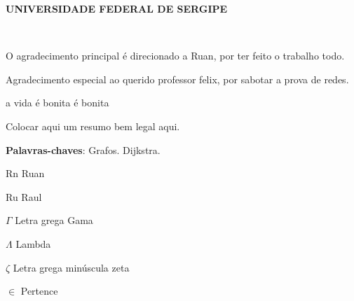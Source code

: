 \documentclass[
	12pt,				%
	openright,			%
	oneside,			%
	a4paper,			%
	english,			%
	french,				%
	spanish,			%
	brazil,				%
	]{abntex2}
\renewcommand{\imprimircapa}{%
	\begin{capa}%
		\center
		\ABNTEXchapterfont\Large \textbf{UNIVERSIDADE FEDERAL DE SERGIPE}
		\\
		\vspace*{1cm}
		{\ABNTEXchapterfont\large\imprimirautor}
		\vfill
		\begin{center}
			\ABNTEXchapterfont\bfseries\LARGE\imprimirtitulo
		\end{center}
		\vfill
		\large\imprimirlocal \\
		\large\imprimirdata
		\vspace*{1cm}
	\end{capa}
}
\begin{document}

\frenchspacing 


\imprimircapa

\imprimirfolhaderosto*

\begin{agradecimentos}
	
	O agradecimento principal é direcionado a Ruan, por ter feito o trabalho todo.
	
	Agradecimento especial ao querido professor felix, por sabotar a prova de redes.
	
	a vida é bonita é bonita
	
\end{agradecimentos}

\setlength{\absparsep}{18pt} %
\begin{resumo}
	Colocar aqui um resumo bem legal aqui.
	
	\noindent
	\textbf{Palavras-chaves}: Grafos. Dijkstra.
\end{resumo}

\listoffigures*
\pagebreak

\listoftables*
\pagebreak

\begin{siglas}
	\item[Rn] Ruan
	\item[Ru] Raul
\end{siglas}

\begin{simbolos}
	\item[$ \Gamma $] Letra grega Gama
	\item[$ \Lambda $] Lambda
	\item[$ \zeta $] Letra grega minúscula zeta
	\item[$ \in $] Pertence
\end{simbolos}
\end{document}
